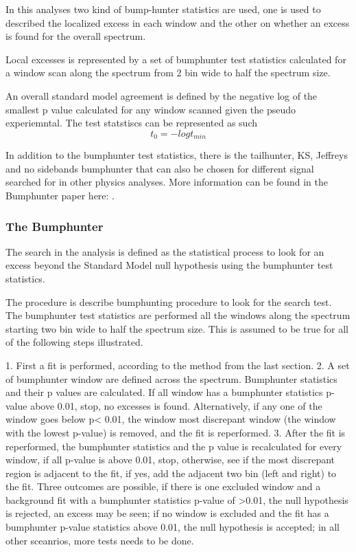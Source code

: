     In this analyses two kind of bump-hunter statistics are used, one is used to described the localized excess in each window and the other on whether an excess is found for the overall spectrum.

    Local excesses is represented by a set of bumphunter test statistics calculated for a window scan along the spectrum from 2 bin wide to half the spectrum size.

    An overall standard model agreement is defined by the negative log of the smallest p value calculated for any window scanned given the pseudo experiemntal. The test statstiscs can be represented as such 
    \[ t_{0} = - log t_{min} \]

    
    In addition to the bumphunter test statistics, there is the tailhunter, KS, Jeffreys and no sidebands bumphunter that can also be chosen for different signal searched for in other physics analyses. More information can be found in the Bumphunter paper here: . 


    \subsubsection{The Bumphunter}
    The search in the analysis is defined as the statistical process to look for an excess beyond the Standard Model null hypothesis using the bumphunter test statistics. 

    The procedure is describe bumphunting procedure to look for the search test.
    The bumphunter test statistics are performed all the windows along the spectrum starting two bin wide to half the spectrum size. This is assumed to be true for all of the following steps illustrated. 

    1.  First a fit is performed, according to the method from the last section.
    2.  A set of bumphunter window are defined across the spectrum. Bumphunter statistics and their p values are calculated. 
    If all window has a bumphunter statistics p-value above 0.01, stop, no excesses is found. Alternatively, if any one of the window goes below p< 0.01, the window most discrepant window (the window with the lowest p-value) is removed, and the fit is reperformed.
    3. After the fit is reperformed, the bumphunter statistics and the p value is recalculated for every window, if all p-value is above 0.01, stop, otherwise, see if the most discrepant region is adjacent to the fit, if yes, add the adjacent two bin (left and right) to the fit. 
    Three outcomes are possible, if there is one excluded window and a background fit with a bumphunter statistics p-value of >0.01, the null hypothesis is rejected, an excess may be seen; if no window is excluded and the fit has a bumphunter p-value statistics above 0.01, the null hypothesis is accepted; in all other sceanrios, more tests needs to be done.

